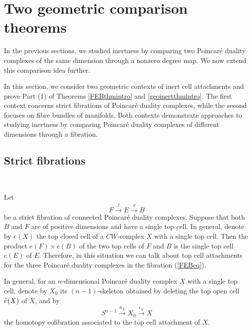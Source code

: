 \documentclass[a4]{amsart}
\theoremstyle{definition}
\begin{document}
\begin{sloppypar}
\newpage
\section{Two geometric comparison theorems}
\label{sec: det2}
In the previous sections, we studied inertness by comparing two Poincar\'{e} duality complexes of the same dimension through a nonzero degree map. We now extend this comparison idea further. 

In this section, we consider two geometric contexts of inert cell attachments and prove Part (1) of Theorems \ref{FEBthmintro} and \ref{geoinertthmintro}. The first context concerns strict fibrations of Poincar\'{e} duality complexes, while the second focuses on fibre bundles of manifolds. 
Both contexts demonstrate approaches to studying inertness by comparing Poincar\'{e} duality complexes of different dimensions through a fibration. 

\subsection{Strict fibrations}
\label{subsec: fibsec}

$\, $


Let 
\begin{equation}\label{FEBeq}
F\stackrel{j}{\longrightarrow} E\stackrel{\pi}{\longrightarrow} B
\end{equation}
 be a strict fibration of connected Poincar\'{e} duality complexes. Suppose that both $B$ and $F$ are of positive dimensions and have a single top cell. In general, denote by $e(X)$ the top closed cell of a $CW$-complex $X$ with a single top cell. 
 Then the product $e(F)\times e(B)$ of the two top cells of $F$ and $B$ is the single top cell $e(E)$ of $E$. Therefore, in this situation we can talk about top cell attachments for the three Poincar\'{e} duality complexes in the fibration (\ref{FEBeq}). 

In general, for an $n$-dimensional Poincar\'{e} duality complex $X$ with a single top cell, denote by $X_0$ its $(n-1)$-skeleton obtained by deleting the top open cell $\accentset{\circ}{e}(X)$ of $X$, and by
\[
S^{n-1}\stackrel{h_X}{\longrightarrow} X_0\stackrel{i_X}{\longrightarrow} X
\] 
the homotopy cofibration associated to the top cell attachment of $X$. 


\end{sloppypar}
\end{document}
